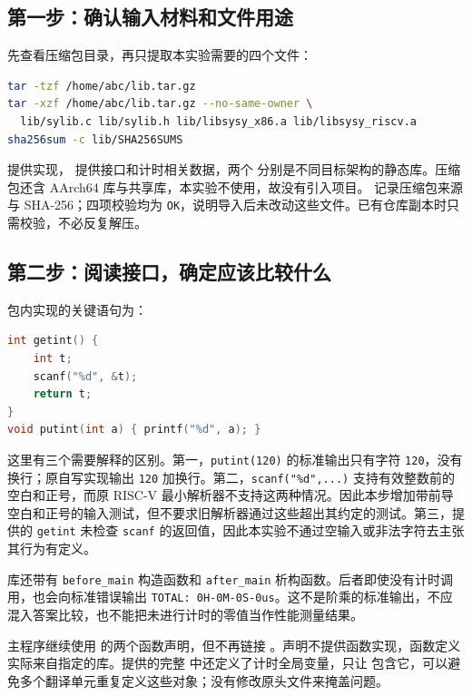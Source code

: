 \documentclass[UTF8,a4paper,12pt]{ctexart}
\begin{document}
\subsection{第一步：确认输入材料和文件用途}

先查看压缩包目录，再只提取本实验需要的四个文件：

\begin{lstlisting}[language=bash]
tar -tzf /home/abc/lib.tar.gz
tar -xzf /home/abc/lib.tar.gz --no-same-owner \
  lib/sylib.c lib/sylib.h lib/libsysy_x86.a lib/libsysy_riscv.a
sha256sum -c lib/SHA256SUMS
\end{lstlisting}

 提供实现， 提供接口和计时相关数据，两个  分别是不同目标架构的静态库。压缩包还含 AArch64 库与共享库，本实验不使用，故没有引入项目。 记录压缩包来源与 SHA-256；四项校验均为 \texttt{OK}，说明导入后未改动这些文件。已有仓库副本时只需校验，不必反复解压。

\subsection{第二步：阅读接口，确定应该比较什么}

包内实现的关键语句为：

\begin{lstlisting}[language=C]
int getint() {
    int t;
    scanf("%d", &t);
    return t;
}
void putint(int a) { printf("%d", a); }
\end{lstlisting}

这里有三个需要解释的区别。第一，\texttt{putint(120)} 的标准输出只有字符 \texttt{120}，没有换行；原自写实现输出 \texttt{120} 加换行。第二，\texttt{scanf("\%d",...)} 支持有效整数前的空白和正号，而原 RISC-V 最小解析器不支持这两种情况。因此本步增加带前导空白和正号的输入测试，但不要求旧解析器通过这些超出其约定的测试。第三，提供的 \texttt{getint} 未检查 \texttt{scanf} 的返回值，因此本实验不通过空输入或非法字符去主张其行为有定义。

库还带有 \texttt{before\_main} 构造函数和 \texttt{after\_main} 析构函数。后者即使没有计时调用，也会向标准错误输出 \texttt{TOTAL: 0H-0M-0S-0us}。这不是阶乘的标准输出，不应混入答案比较，也不能把未进行计时的零值当作性能测量结果。

主程序继续使用  的两个函数声明，但不再链接 。声明不提供函数实现，函数定义实际来自指定的库。提供的完整  中还定义了计时全局变量，只让  包含它，可以避免多个翻译单元重复定义这些对象；没有修改原头文件来掩盖问题。
\end{document}
